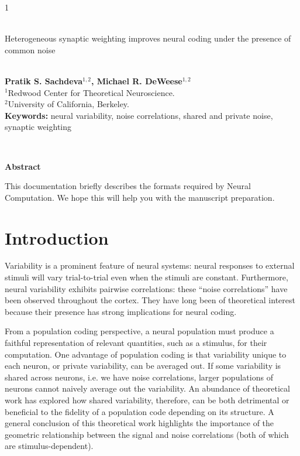\documentclass[12pt]{article}
\begin{document}
\hspace{13.9cm}1

\ \vspace{20mm}\\

{\LARGE Heterogeneous synaptic weighting improves neural coding under the presence of common noise}

\ \\
{\bf \large Pratik S. Sachdeva$^{\displaystyle 1, \displaystyle 2}$, Michael R. DeWeese$^{\displaystyle 1, \displaystyle 2}$}\\
{$^{\displaystyle 1}$Redwood Center for Theoretical Neuroscience.}\\
{$^{\displaystyle 2}$University of California, Berkeley.}\\
%

{\bf Keywords:} neural variability, noise correlations, shared and private noise, synaptic weighting

\thispagestyle{empty}
%
\ \vspace{-0mm}\\
%
\begin{center} {\bf Abstract} \end{center}
This documentation briefly describes the formats required by Neural Computation. We hope this will help you with the manuscript preparation.

\section{Introduction}
Variability is a prominent feature of neural systems: neural responses to external stimuli will vary trial-to-trial even when the stimuli are constant. Furthermore, neural variability exhibits pairwise correlations: these ``noise correlations'' have been observed throughout the cortex. They have long been of theoretical interest because their presence has strong implications for neural coding.

From a population coding perspective, a neural population must produce a faithful representation of relevant quantities, such as a stimulus, for their computation. One advantage of population coding is that variability unique to each neuron, or private variability, can be averaged out. If some variability is shared across neurons, i.e. we have noise correlations, larger populations of neurons cannot naively average out the variability. An abundance of theoretical work has explored how shared variability, therefore, can be both detrimental or beneficial to the fidelity of a population code depending on its structure. A  general conclusion of this theoretical work highlights the importance of the geometric relationship between the signal and noise correlations (both of which are stimulus-dependent).
\end{document}
